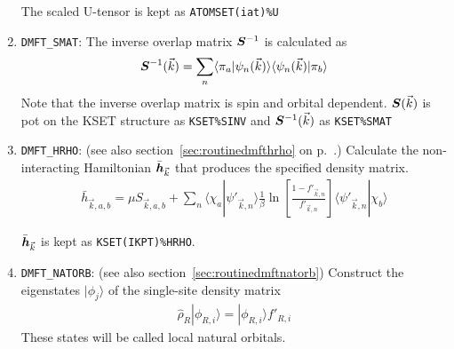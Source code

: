 \documentclass[11pt,a4paper]{report}
\begin{document}
\begin{enumerate}
The scaled U-tensor is kept as \verb|ATOMSET(iat)%U|
%
\item \verb|DMFT_SMAT|: The inverse overlap matrix $\bm{S}^{-1}$ is
  calculated as
\begin{eqnarray}
\bm{S}^{-1}(\vec{k})
=\sum_n\langle\pi_a|\psi_n(\vec{k})\rangle\langle\psi_n(\vec{k})|\pi_b\rangle
\end{eqnarray}
Note that the inverse overlap matrix is spin and orbital dependent.
$\bm{S}(\vec{k})$ is pot on the KSET structure as \verb|KSET%SINV| 
and $\bm{S}^{-1}(\vec{k})$ as \verb|KSET%SMAT| 
%
\item \verb|DMFT_HRHO|: (see also section~\ref{sec:routinedmfthrho} on
p.~\pageref{sec:routinedmfthrho}.) Calculate the non-interacting
Hamiltonian $\bar{\bm{h}}_{\vec{k}}$ that produces the specified
density matrix.
\begin{eqnarray}
\bar{h}_{\vec{k},a,b}=\mu S_{\vec{k},a,b}+\sum_{n}
\langle\chi_a|\psi'_{\vec{k},n}\rangle\frac{1}{\beta}
\ln\left[\frac{1-f'_{\vec{k},n}}{f'_{\vec{k},n}}\right]
\langle\psi'_{\vec{k},n}|\chi_b\rangle
\end{eqnarray}

$\bar{\bm{h}}_{\vec{k}}$ is kept as \verb|KSET(IKPT)%HRHO|.
%
\item \verb|DMFT_NATORB|: (see also section~\ref{sec:routinedmftnatorb})
  Construct the eigenstates $|\phi_j\rangle$ of the single-site
  density matrix
\begin{eqnarray}
\hat{\rho}_R|\phi_{R,i}\rangle=|\phi_{R,i}\rangle f'_{R,i}
\end{eqnarray}
These states will be called local natural orbitals.


\end{enumerate}
\end{document}
